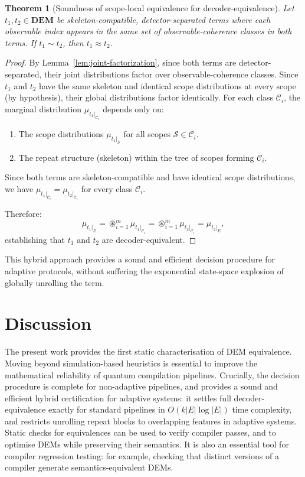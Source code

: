 \documentclass[11pt,a4paper]{article}
\newtheorem{theorem}{Theorem}
\newcommand{\dist}[1]{\mu_{#1}}   %
\begin{document}
\begin{theorem}[Soundness of scope-local equivalence for decoder-equivalence]
\label{thm:generalised-soundness}
Let $t_1, t_2 \in \mathbf{DEM}$ be skeleton-compatible, detector-separated terms where each observable index appears in the same set of observable-coherence classes in both terms. If $t_1 \sim t_2$, then $t_1 \approx t_2$.
\end{theorem}

\begin{proof}
By Lemma~\ref{lem:joint-factorization}, since both terms are detector-separated, their joint distributions factor over observable-coherence classes. Since $t_1$ and $t_2$ have the same skeleton and identical scope distributions at every scope (by hypothesis), their global distributions factor identically. For each class $\mathcal{C}_i$, the marginal distribution $\dist{t_1|_{\mathcal{C}_i}}$ depends only on:
\begin{enumerate}
  \item The scope distributions $\dist{t_1|_{\mathcal{S}}}$ for all scopes $\mathcal{S} \in \mathcal{C}_i$.
  \item The repeat structure (skeleton) within the tree of scopes forming $\mathcal{C}_i$.
\end{enumerate}
Since both terms are skeleton-compatible and have identical scope distributions, we have $\dist{t_1|_{\mathcal{C}_i}} = \dist{t_2|_{\mathcal{C}_i}}$ for every class $\mathcal{C}_i$.

Therefore:
\[
  \dist{t_1|_E} = \circledast_{i=1}^m \dist{t_1|_{\mathcal{C}_i}} = \circledast_{i=1}^m \dist{t_2|_{\mathcal{C}_i}} = \dist{t_2|_E},
\]
establishing that $t_1$ and $t_2$ are decoder-equivalent.
\end{proof}

This hybrid approach provides a sound and efficient decision procedure for adaptive protocols, without suffering the exponential state-space explosion of globally unrolling the term.

\section{Discussion}
\label{sec:discussion}

The present work provides the first static characterisation of DEM equivalence. Moving beyond simulation-based heuristics is essential to improve the mathematical reliability of quantum compilation pipelines. Crucially, the decision procedure is complete for non-adaptive pipelines, and provides a sound and efficient hybrid certification for adaptive systems: it settles full decoder-equivalence exactly for standard pipelines in $O(k|E|\log|E|)$ time complexity, and restricts unrolling repeat blocks to overlapping features in adaptive systems. Static checks for equivalences can be used to verify compiler passes, and to optimise DEMs while preserving their semantics. It is also an essential tool for compiler regression testing: for example, checking that distinct versions of a compiler generate semantics-equivalent DEMs.
\end{document}
